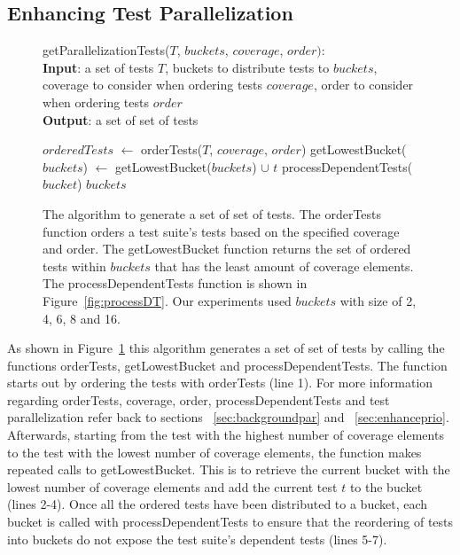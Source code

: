 \subsection{Enhancing Test Parallelization}
\label{sec:enhancepar}
\begin{figure}[t]
	getParallelizationTests($\mathit{T}$, $\mathit{buckets}$, $\mathit{coverage}$,
	$\mathit{order}):$\\
	\textbf{Input}: a set of tests $\mathit{T}$, buckets to distribute tests to
	$\mathit{buckets}$, coverage to consider when ordering tests 
	$\mathit{coverage}$, order to consider when ordering tests $\mathit{order}$\\
	\textbf{Output}: a set of set of tests\\
	 \begin{algorithmic}[1]
	 	\vspace{-5mm}
		\STATE $\mathit{orderedTests}$ $\leftarrow$ orderTests($\mathit{T}$,
		$\mathit{coverage}$, $\mathit{order}$)
			\STATE getLowestBucket($\mathit{buckets}$) $\leftarrow$
			getLowestBucket($\mathit{buckets}$) $\cup$ $\mathit{t}$
		\ENDFOR
			\STATE processDependentTests($\mathit{bucket}$)
		\ENDFOR
		\RETURN $\mathit{buckets}$
	\end{algorithmic}
	\vspace{-3mm}
	\caption {
		The algorithm to generate a set of set of tests. The orderTests function
		orders a test suite's tests based on the specified coverage and order.
		The getLowestBucket function returns the set of ordered tests within
		$\mathit{buckets}$ that has the least amount of coverage elements. The
		processDependentTests function is shown in Figure~\ref{fig:processDT}. Our
		experiments used $\mathit{buckets}$ with size of 2, 4, 6, 8 and 16.
	}
	\label{fig:parallelization}
\end{figure}

As shown in Figure~\ref{fig:parallelization} this algorithm generates a set of
set of tests by calling the functions orderTests, getLowestBucket and
processDependentTests. The function starts out by ordering the tests with
orderTests (line 1). For more information regarding orderTests, coverage, order,
processDependentTests and test parallelization refer back to sections
 ~\ref{sec:backgroundpar} and ~\ref{sec:enhanceprio}. Afterwards, starting from
the test with the highest number of coverage elements to the test with the
lowest number of coverage elements, the function makes repeated calls to
getLowestBucket. This is to retrieve the current bucket with the lowest number
of coverage elements and add the current test $\mathit{t}$ to the bucket (lines
2-4). Once all the ordered tests have been distributed to a bucket, each bucket
is called with processDependentTests to ensure that the reordering of tests
into buckets do not expose the test suite's dependent tests (lines 5-7).